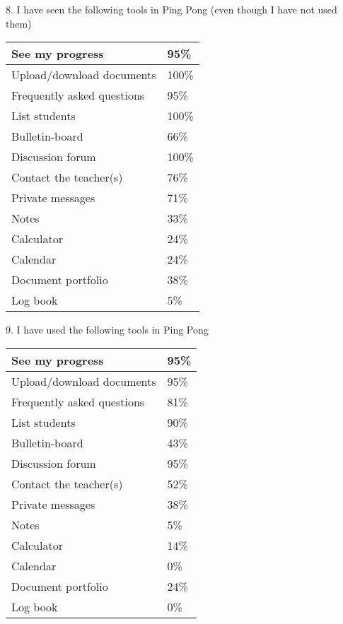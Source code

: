 8. I have seen the following tools in Ping Pong (even though I have not used them)

\begin{center}
    \begin{tabular}{ | l | l | }
    \hline
    See my progress & 95\% \\ \hline
	Upload/download documents & 100\% \\ \hline
	Frequently asked questions & 95\% \\ \hline
	List students & 100\% \\ \hline
	Bulletin-board & 66\% \\ \hline
	Discussion forum & 100\% \\ \hline
	Contact the teacher(s) & 76\% \\ \hline
	Private messages & 71\% \\ \hline
	Notes & 33\% \\ \hline
	Calculator & 24\% \\ \hline
	Calendar & 24\% \\ \hline
	Document portfolio & 38\% \\ \hline
	Log book & 5\% \\ \hline
    \end{tabular}
\end{center}

					
9. I have used the following tools in Ping Pong

\begin{center}
    \begin{tabular}{ | l | l | }
    \hline
    See my progress & 95\% \\ \hline
	Upload/download documents & 95\% \\ \hline
	Frequently asked questions & 81\% \\ \hline
	List students & 90\% \\ \hline
	Bulletin-board & 43\% \\ \hline
	Discussion forum & 95\% \\ \hline
	Contact the teacher(s) & 52\% \\ \hline
	Private messages & 38\% \\ \hline
	Notes & 5\% \\ \hline
	Calculator & 14\% \\ \hline
	Calendar & 0\% \\ \hline
	Document portfolio & 24\% \\ \hline
	Log book & 0\% \\ \hline
    \end{tabular}
\end{center}

